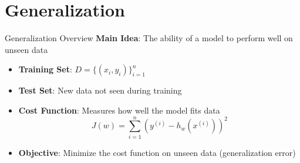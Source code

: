 \documentclass[serif, aspectratio=169]{beamer}
\begin{document}
    
    


\section{Generalization}
\begin{frame}{Generalization Overview}
    \textbf{Main Idea}: The ability of a model to perform well on unseen data
    \begin{itemize}
        \item \textbf{Training Set}: \( D = \{(x_i, y_i)\}_{i=1}^n \)
        \item \textbf{Test Set}: New data not seen during training
        \item \textbf{Cost Function}: Measures how well the model fits data
        \[
        J(w) = \sum_{i=1}^{n} (y^{(i)} - h_w(x^{(i)}))^2
        \]
        \item \textbf{Objective}: Minimize the cost function on unseen data (generalization error)
    \end{itemize}
\end{frame}
\end{document}
